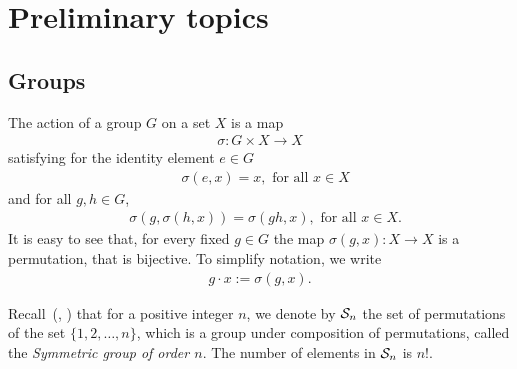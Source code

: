 \clearpage{\thispagestyle{empty}}
\section{Preliminary topics}

\subsection{Groups}


The action of a group $G$ on a set $X$ is a map
\begin{align*}
	\sigma : G \times X \rightarrow X
\end{align*}
satisfying for the identity element $e \in G$ 
\begin{align*}
	&\sigma(e,x) = x, \text{ for all $x \in X$}
\end{align*}
and for all $g,h \in G$,
\begin{align*}
	&\sigma (g, \sigma(h,x)) = \sigma(gh, x), \text{ for all } x \in X.
\end{align*}
It is easy to see that, for every fixed $g \in G$ the map $\sigma(g, x): X \rightarrow X$ is a permutation, that is bijective. To simplify notation, we write
\begin{align*}
	g \cdot x := \sigma(g,x).
\end{align*}

%


Recall~(\cite[1.3.]{DummitFoote}, \cite[1.1]{Sagan}) that for a positive integer $n$, we denote by $\mathcal{S}_n$ the set of permutations of the set $\{1, 2, \dots, n\}$, which is a group under composition of permutations, called the \textit{Symmetric group of order $n$}. The number of elements in $\mathcal{S}_n$ is $n!$.

